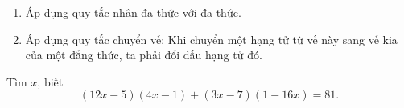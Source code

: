 \begin{dang}
	\begin{enumerate}[\tickEX]
		\item Áp dụng quy tắc nhân đa thức với đa thức.
		\item Áp dụng quy tắc chuyển vế: Khi chuyển một hạng tử từ vế này sang vế kia của một đẳng thức, ta phải đổi dấu hạng tử đó.
	\end{enumerate}
\end{dang}
\begin{vd}
	Tìm $x$, biết \[(12x-5)(4x-1)+(3x-7)(1-16x)=81.\]
\end{vd}
